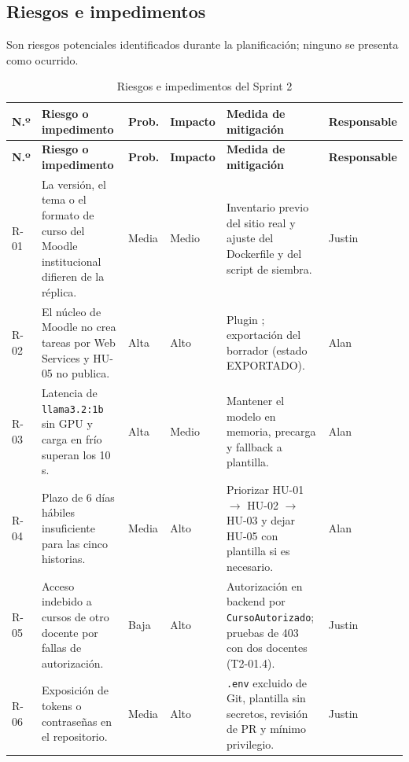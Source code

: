 \documentclass[11pt,a4paper]{article}
\newcommand{\hd}[1]{\textbf{#1}}
\begin{document}
\subsection{Riesgos e impedimentos}
Son riesgos potenciales identificados durante la planificación; ninguno se presenta como ocurrido.

\begin{longtable}{|R{1.1cm}|R{4.4cm}|R{1.3cm}|R{1.5cm}|R{4.1cm}|R{1.6cm}|}
\caption{Riesgos e impedimentos del Sprint 2}\\
\hline \hd{N.º} & \hd{Riesgo o impedimento} & \hd{Prob.} & \hd{Impacto} & \hd{Medida de mitigación} & \hd{Responsable}\\ \hline \endfirsthead
\hline \hd{N.º} & \hd{Riesgo o impedimento} & \hd{Prob.} & \hd{Impacto} & \hd{Medida de mitigación} & \hd{Responsable}\\ \hline \endhead
\footnotesize R-01 & \footnotesize La versión, el tema o el formato de curso del Moodle institucional difieren de la réplica. & \footnotesize Media & \footnotesize Medio & \footnotesize Inventario previo del sitio real y ajuste del Dockerfile y del script de siembra. & \footnotesize Justin\\ \hline
\footnotesize R-02 & \footnotesize El núcleo de Moodle no crea tareas por Web Services y HU-05 no publica. & \footnotesize Alta & \footnotesize Alto & \footnotesize Plugin ; exportación del borrador (estado EXPORTADO). & \footnotesize Alan\\ \hline
\footnotesize R-03 & \footnotesize Latencia de \texttt{llama3.2:1b} sin GPU y carga en frío superan los 10 s. & \footnotesize Alta & \footnotesize Medio & \footnotesize Mantener el modelo en memoria, precarga y fallback a plantilla. & \footnotesize Alan\\ \hline
\footnotesize R-04 & \footnotesize Plazo de 6 días hábiles insuficiente para las cinco historias. & \footnotesize Media & \footnotesize Alto & \footnotesize Priorizar HU-01 $\rightarrow$ HU-02 $\rightarrow$ HU-03 y dejar HU-05 con plantilla si es necesario. & \footnotesize Alan\\ \hline
\footnotesize R-05 & \footnotesize Acceso indebido a cursos de otro docente por fallas de autorización. & \footnotesize Baja & \footnotesize Alto & \footnotesize Autorización en backend por \texttt{CursoAutorizado}; pruebas de 403 con dos docentes (T2-01.4). & \footnotesize Justin\\ \hline
\footnotesize R-06 & \footnotesize Exposición de tokens o contraseñas en el repositorio. & \footnotesize Media & \footnotesize Alto & \footnotesize \texttt{.env} excluido de Git, plantilla sin secretos, revisión de PR y mínimo privilegio. & \footnotesize Justin\\ \hline

\end{longtable}
\end{document}
